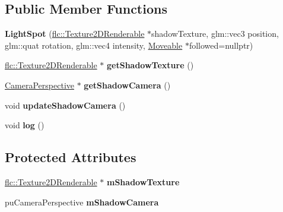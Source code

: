 \subsection*{Public Member Functions}
\begin{DoxyCompactItemize}
\item 
{\bfseries Light\+Spot} (\hyperlink{classflw_1_1flc_1_1Texture2DRenderable}{flc\+::\+Texture2\+D\+Renderable} $\ast$shadow\+Texture, glm\+::vec3 position, glm\+::quat rotation, glm\+::vec4 intensity, \hyperlink{classflw_1_1flf_1_1Moveable}{Moveable} $\ast$followed=nullptr)\hypertarget{classflw_1_1flf_1_1LightSpot_a7f824ebd8f341ec385e3f201c6fa0b14}{}\label{classflw_1_1flf_1_1LightSpot_a7f824ebd8f341ec385e3f201c6fa0b14}

\item 
\hyperlink{classflw_1_1flc_1_1Texture2DRenderable}{flc\+::\+Texture2\+D\+Renderable} $\ast$ {\bfseries get\+Shadow\+Texture} ()\hypertarget{classflw_1_1flf_1_1LightSpot_a70b5a358f4e40246483ac6e43561c2f0}{}\label{classflw_1_1flf_1_1LightSpot_a70b5a358f4e40246483ac6e43561c2f0}

\item 
\hyperlink{classflw_1_1flf_1_1CameraPerspective}{Camera\+Perspective} $\ast$ {\bfseries get\+Shadow\+Camera} ()\hypertarget{classflw_1_1flf_1_1LightSpot_aa567ffe725d6f3d8ed68127b573d1d30}{}\label{classflw_1_1flf_1_1LightSpot_aa567ffe725d6f3d8ed68127b573d1d30}

\item 
void {\bfseries update\+Shadow\+Camera} ()\hypertarget{classflw_1_1flf_1_1LightSpot_acb22788e20701eb306dc4de6d4942694}{}\label{classflw_1_1flf_1_1LightSpot_acb22788e20701eb306dc4de6d4942694}

\item 
void {\bfseries log} ()\hypertarget{classflw_1_1flf_1_1LightSpot_a341fffa52865761169300bc812715fe7}{}\label{classflw_1_1flf_1_1LightSpot_a341fffa52865761169300bc812715fe7}

\end{DoxyCompactItemize}
\subsection*{Protected Attributes}
\begin{DoxyCompactItemize}
\item 
\hyperlink{classflw_1_1flc_1_1Texture2DRenderable}{flc\+::\+Texture2\+D\+Renderable} $\ast$ {\bfseries m\+Shadow\+Texture}\hypertarget{classflw_1_1flf_1_1LightSpot_ada8bc8c8e1b97ac39fadf5d818afbde1}{}\label{classflw_1_1flf_1_1LightSpot_ada8bc8c8e1b97ac39fadf5d818afbde1}

\item 
pu\+Camera\+Perspective {\bfseries m\+Shadow\+Camera}\hypertarget{classflw_1_1flf_1_1LightSpot_aac27c310b7af304bc809a9e9c18a284f}{}\label{classflw_1_1flf_1_1LightSpot_aac27c310b7af304bc809a9e9c18a284f}

\end{DoxyCompactItemize}


